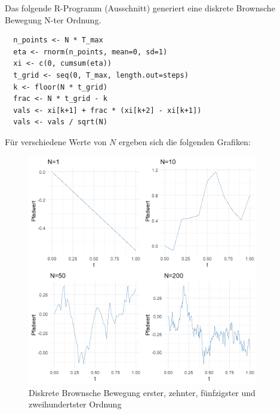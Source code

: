 \begin{bsp}
Das folgende R-Programm (Ausschnitt) generiert eine diskrete Brownsche Bewegung N-ter Ordnung.

\begin{lstlisting}
  n_points <- N * T_max
  eta <- rnorm(n_points, mean=0, sd=1)
  xi <- c(0, cumsum(eta))
  t_grid <- seq(0, T_max, length.out=steps)
  k <- floor(N * t_grid)
  frac <- N * t_grid - k
  vals <- xi[k+1] + frac * (xi[k+2] - xi[k+1])
  vals <- vals / sqrt(N)
\end{lstlisting}
Für verschiedene Werte von $N$ ergeben sich die folgenden Grafiken:

\begin{figure}[H]
    \centering
    \includegraphics[width=0.9\textwidth]{images/disrete_bb.png}
    \caption{Diskrete Brownsche Bewegung erster, zehnter, fünfzigster und zweihundertster Ordnung}
    \label{fig:brownian}
\end{figure}

\end{bsp}

